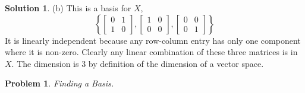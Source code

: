\documentclass{article}
\newtheorem{problem}{Problem}
\theoremstyle{definition}
\newtheorem*{solution}{Solution}
\begin{document}
\begin{solution}
(b) This is a basis for $X$,
\[\left\{
\begin{bmatrix}
0 & 1 \\ 1 & 0
\end{bmatrix},
\begin{bmatrix}
1 & 0 \\ 0 & 0
\end{bmatrix},
\begin{bmatrix}
0 & 0 \\ 0 & 1
\end{bmatrix}
\right\}\]
It is linearly independent because any row-column entry has only one component where it is non-zero.
Clearly any linear combination of these three matrices is in $X$.
The dimension is $3$ by definition of the dimension of a vector space.

\end{solution}

\begin{problem}

Finding a Basis.

\end{problem}
\end{document}
